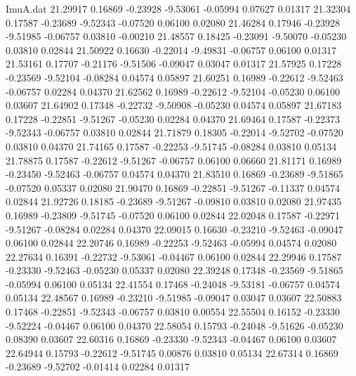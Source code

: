 \begin{filecontents}{ImuA.dat}
  21.29917    0.16869   -0.23928   -9.53061   -0.05994    0.07627    0.01317
  21.32304    0.17587   -0.23689   -9.52343   -0.07520    0.06100    0.02080
  21.46284    0.17946   -0.23928   -9.51985   -0.06757    0.03810   -0.00210
  21.48557    0.18425   -0.23091   -9.50070   -0.05230    0.03810    0.02844
  21.50922    0.16630   -0.22014   -9.49831   -0.06757    0.06100    0.01317
  21.53161    0.17707   -0.21176   -9.51506   -0.09047    0.03047    0.01317
  21.57925    0.17228   -0.23569   -9.52104   -0.08284    0.04574    0.05897
  21.60251    0.16989   -0.22612   -9.52463   -0.06757    0.02284    0.04370
  21.62562    0.16989   -0.22612   -9.52104   -0.05230    0.06100    0.03607
  21.64902    0.17348   -0.22732   -9.50908   -0.05230    0.04574    0.05897
  21.67183    0.17228   -0.22851   -9.51267   -0.05230    0.02284    0.04370
  21.69464    0.17587   -0.22373   -9.52343   -0.06757    0.03810    0.02844
  21.71879    0.18305   -0.22014   -9.52702   -0.07520    0.03810    0.04370
  21.74165    0.17587   -0.22253   -9.51745   -0.08284    0.03810    0.05134
  21.78875    0.17587   -0.22612   -9.51267   -0.06757    0.06100    0.06660
  21.81171    0.16989   -0.23450   -9.52463   -0.06757    0.04574    0.04370
  21.83510    0.16869   -0.23689   -9.51865   -0.07520    0.05337    0.02080
  21.90470    0.16869   -0.22851   -9.51267   -0.11337    0.04574    0.02844
  21.92726    0.18185   -0.23689   -9.51267   -0.09810    0.03810    0.02080
  21.97435    0.16989   -0.23809   -9.51745   -0.07520    0.06100    0.02844
  22.02048    0.17587   -0.22971   -9.51267   -0.08284    0.02284    0.04370
  22.09015    0.16630   -0.23210   -9.52463   -0.09047    0.06100    0.02844
  22.20746    0.16989   -0.22253   -9.52463   -0.05994    0.04574    0.02080
  22.27634    0.16391   -0.22732   -9.53061   -0.04467    0.06100    0.02844
  22.29946    0.17587   -0.23330   -9.52463   -0.05230    0.05337    0.02080
  22.39248    0.17348   -0.23569   -9.51865   -0.05994    0.06100    0.05134
  22.41554    0.17468   -0.24048   -9.53181   -0.06757    0.04574    0.05134
  22.48567    0.16989   -0.23210   -9.51985   -0.09047    0.03047    0.03607
  22.50883    0.17468   -0.22851   -9.52343   -0.06757    0.03810    0.00554
  22.55504    0.16152   -0.23330   -9.52224   -0.04467    0.06100    0.04370
  22.58054    0.15793   -0.24048   -9.51626   -0.05230    0.08390    0.03607
  22.60316    0.16869   -0.23330   -9.52343   -0.04467    0.06100    0.03607
  22.64944    0.15793   -0.22612   -9.51745    0.00876    0.03810    0.05134
  22.67314    0.16869   -0.23689   -9.52702   -0.01414    0.02284    0.01317

\end{filecontents}

